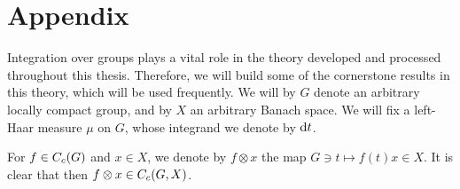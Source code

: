 \chapter{Appendix}
Integration over groups plays a vital role in the theory developed and processed throughout this thesis. Therefore, we will build some of the cornerstone results in this theory, which will be used frequently. We will by $G$ denote an arbitrary locally compact group, and by $X$ an arbitrary Banach space. We will fix a left-Haar measure $\mu$ on $G$, whose integrand we denote by $\mathrm{d} t$.

For $f \in C_c(G)$ and $x \in X$, we denote by $f \otimes x$ the map $G \ni t \mapsto f(t)x \in X$. It is clear that then $f \otimes x \in C_c(G,X)$.
